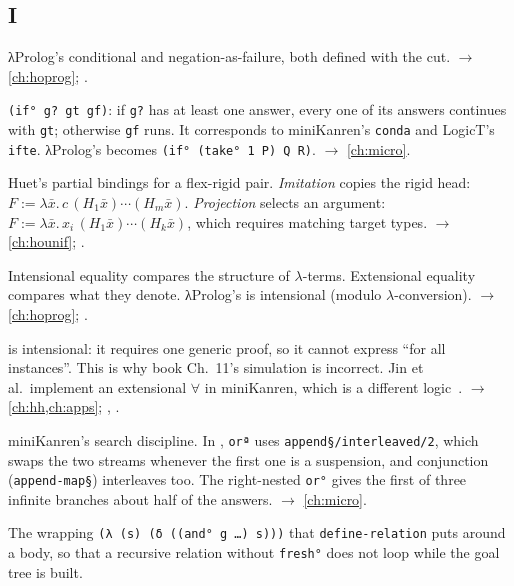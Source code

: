 \subsection*{I}
\begin{glossarylist}
\item[\texttt{if}, \texttt{not}] λProlog's conditional and negation-as-failure, both defined with the cut.
  $\rightarrow$ \cref{ch:hoprog}; .
\item[\texttt{if°} (soft cut)] \texttt{(if° g? gt gf)}: if \texttt{g?} has at least one answer, every one of
  its answers continues with \texttt{gt}; otherwise \texttt{gf} runs. It corresponds to miniKanren's
  \texttt{conda} and LogicT's \texttt{ifte}. λProlog's  becomes \texttt{(if° (take° 1 P) Q R)}.
  $\rightarrow$ \cref{ch:micro}.
\item[Imitation, projection] Huet's partial bindings for a flex-rigid pair. \emph{Imitation} copies the rigid head:
  $F:=\lambda\bar x.\,c\,(H_1\bar x)\cdots(H_m\bar x)$. \emph{Projection} selects an argument:
  $F:=\lambda\bar x.\,x_i\,(H_1\bar x)\cdots(H_k\bar x)$, which requires matching target types.
  $\rightarrow$ \cref{ch:hounif}; .
\item[Intensional / extensional equality] Intensional equality compares the structure of $\lambda$-terms.
  Extensional equality compares what they denote. λProlog's \lp{=} is intensional (modulo $\lambda$-conversion).
  $\rightarrow$ \cref{ch:hoprog}; .
\item[Intensional / extensional $\forall$]  is intensional: it requires one generic proof, so it cannot
  express \enquote{for all instances}. This is why book Ch.~11's simulation is incorrect. Jin et al.\ implement an
  extensional $\forall$ in miniKanren, which is a different logic~\cite{JinEtAl2021}.
  $\rightarrow$ \cref{ch:hh,ch:apps}; , .
\item[Interleaving] miniKanren's search discipline. In \micro{}, \texttt{orª} uses
  \texttt{append§/interleaved/2}, which swaps the two streams whenever the first one is a suspension, and
  conjunction (\texttt{append-map§}) interleaves too. The right-nested \texttt{or°} gives the first of three
  infinite branches about half of the answers. $\rightarrow$ \cref{ch:micro}.
\item[Inverse-$\eta$ delay] The wrapping \texttt{(λ (s) (δ ((and° g …) s)))} that \texttt{define-relation} puts
  around a body, so that a recursive relation without \texttt{fresh°} does not loop while the goal tree is built.

\end{glossarylist}
